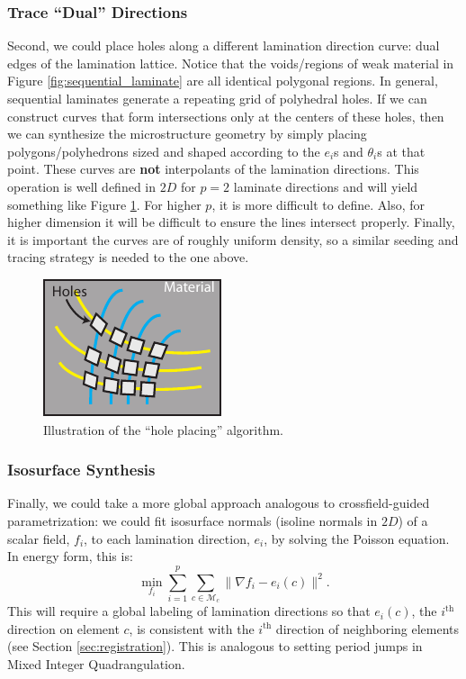 \documentclass[10pt]{article}
\providecommand{\norm}[1]{\lVert#1\rVert}
\providecommand{\mesh}{\mathcal{M}}
\begin{document}
\subsubsection{Trace ``Dual'' Directions}
\label{sec:dual_trace}
Second, we could place holes along a different lamination direction curve: dual
edges of the lamination lattice. Notice that the voids/regions of weak material
in Figure \ref{fig:sequential_laminate} are all identical polygonal regions. In
general, sequential laminates generate a repeating grid of polyhedral holes. If
we can construct curves that form intersections only at the centers of
these holes, then we can synthesize the microstructure geometry by simply placing
polygons/polyhedrons sized and shaped according to the $e_i$s and $\theta_i$s at
that point. These curves are \textbf{not} interpolants of the lamination
directions. This operation is well defined in $2D$ for $p = 2$ laminate
directions and will yield something like Figure \ref{fig:hole_place}. For higher
$p$, it is more difficult to define. Also, for higher dimension it will be
difficult to ensure the lines intersect properly. Finally, it is important the
curves are of roughly uniform density, so a similar seeding and tracing strategy
is needed to the one above.

\begin{figure}[h!]
    \centering
\includegraphics[height=0.3\textwidth]{images/hole_packing}
\caption{Illustration of the ``hole placing'' algorithm.}
\label{fig:hole_place}
\end{figure}

\subsubsection{Isosurface Synthesis}
\label{sec:isosurface}
Finally, we could take a more global approach analogous to crossfield-guided
parametrization: we could fit isosurface normals (isoline normals in
$2D$) of a scalar field, $f_i$, to each lamination direction, $e_i$, by solving
the Poisson equation. In energy form, this is:
$$
\min_{f_i} \sum_{i=1}^p \sum_{c \in \mesh_c} \norm{\nabla f_i - e_i(c)}^2.
$$
This will require a global labeling of lamination directions so that $e_i(c)$, the
$i^\text{th}$ direction on element $c$, is consistent with the $i^\text{th}$
direction of neighboring elements (see Section \ref{sec:registration}). This is
analogous to setting period jumps in Mixed Integer Quadrangulation.
\end{document}
